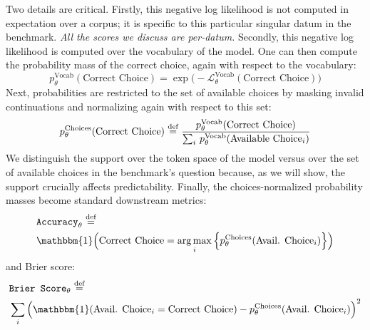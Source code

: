 Two details are critical. Firstly, this negative log likelihood is not computed in expectation over a corpus; it is specific to this particular singular datum in the benchmark. \textit{All the scores we discuss are per-datum.} Secondly, this negative log likelihood is computed over the vocabulary of the model. One can then compute the probability mass of the correct choice, again with respect to the vocabulary:
%
\begin{equation*}
    p_{\theta}^{\text{Vocab}}(\text{Correct Choice}) = \exp \big(-\mathcal{L}_{\theta}^{\text{Vocab}}(\text{Correct Choice}) \big) \label{eqn:p_correct_vocab}
\end{equation*}
%
Next, probabilities are restricted to the set of available choices by masking invalid continuations and normalizing again with respect to this set:
%
\begin{equation*}
    p_{\theta}^{\text{Choices}}(\text{Correct Choice}) \operatorname{\stackrel{\text{def}}{\;=\;}} \frac{p_{\theta}^{\text{Vocab}}(\text{Correct Choice})}{\sum_{i} \, p_{\theta}^{\text{Vocab}}(\text{Available Choice}_i)} \label{eqn:p_correct_choices}
\end{equation*}
%
We distinguish the support over the token space of the model versus over the set of available choices in the benchmark's question because, as we will show, the support crucially affects predictability. 
Finally, the choices-normalized probability masses become standard downstream metrics:
%
\begin{align*}
    &\texttt{Accuracy}_{\theta} \defeq\\
    &\mathbbm{1} \Big( \text{Correct Choice} = \argmax_{i} \Big\{ p_{\theta}^{\text{Choices}}(\text{Avail. Choice}_i) \Big\} \Big)
\end{align*}
\label{eqn:accuracy}
%
and Brier score:
\begin{align*}
    &\texttt{Brier Score}_{\theta} \defeq \\
    &\sum_{i} \Big(\mathbbm{1}(\text{Avail. Choice}_i = \text{Correct Choice}) - p_{\theta}^{\text{Choices}}(\text{Avail. Choice}_i) \Big)^2
\end{align*}
